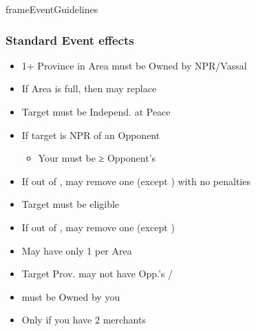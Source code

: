 \documentclass[10pt]{article}
\newlength{\fhEventGuidelines} \setlength\fhEventGuidelines{35\baselineskip}
\begin{document}
\begin{dynamiccontents*}{frameEventGuidelines}
\begin{eubox}{\fhEventGuidelines}
\begin{multicols}{2}
		\subsubsection*{Standard Event effects }
		\begin{itemize}
			\item 1+ Province in Area must be Owned by NPR/Vassal
			\item If Area is full, then may replace \influence
		\end{itemize}
		\begin{itemize}
			\item Target must be Independ.  at Peace
			\item If target is NPR \ally of an Opponent
			\begin{itemize}
				\item Your \influence must be ≥ Opponent's \influence
			\end{itemize}
			\item If out of \alliances, may remove one (except \activeally) with no penalties
		\end{itemize}
		\begin{itemize}
			\item Target must be eligible
			\item If out of \marriages, may remove one (except \disputedsuccession)
		\end{itemize}
		\begin{itemize}
			\item May have only 1 per Area
		\end{itemize}
		\begin{itemize}
			\item Target Prov. may not have Opp.'s \town/\vassal
		\end{itemize}
		\begin{itemize}
			\item \town must be Owned by you
		\end{itemize}	
		\begin{itemize}
			\item Only if you have 2 merchants
		\end{itemize}
		\begin{itemize}

\end{itemize}
\end{multicols}
\end{eubox}
\end{dynamiccontents*}
\end{document}
